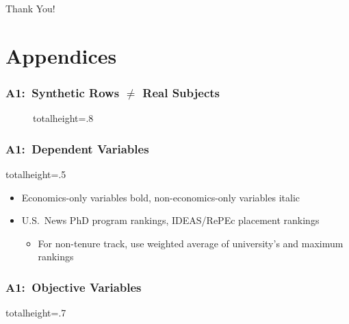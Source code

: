 \documentclass[12pt, aspectratio=169]{beamer}
\newcommand{\backupbegin}{
   \newcounter{finalframe}
   \setcounter{finalframe}{\value{framenumber}}
}
\begin{document}
\begin{frame}[label=ty]
\centering
\Huge Thank You!
\end{frame}

\backupbegin
\section*{Appendices}
\begin{frame}[label=sde]
\frametitle{A1:\ Synthetic Rows $\neq$ Real Subjects}
\begin{figure}
  \centering
  \begin{adjustbox}{totalheight=.8\textheight}

  \end{adjustbox}
\end{figure}%
\hyperlink{sdp}{}
\end{frame}

\begin{frame}[label=dv]
\frametitle{A1:\ Dependent Variables}
\begin{table}[htbp]
  \centering
  \renewcommand{\thetable}{\arabic{table}a}
  \caption{Dependent Variables}
  \vspace{5pt}
  \begin{adjustbox}{totalheight=.5\textheight}

  \end{adjustbox}
\end{table}%
\begin{itemize}
\item Economics-only variables bold, non-economics-only variables italic
\vspace{2.5pt}
\item U.S.\ News PhD program rankings, IDEAS/RePEc placement rankings
\vspace{1.25pt}
\begin{itemize}
\item For non-tenure track, use weighted average of university's and maximum rankings
\vspace{2.5pt}
\end{itemize}
\end{itemize}
\hyperlink{dd}{}
\end{frame}

\begin{frame}[label=ov]
\frametitle{A1:\ Objective Variables}
\addtocounter{framenumber}{-1}
\begin{table}[htbp]
  \centering
  \addtocounter{table}{-1}
  \renewcommand{\thetable}{\arabic{table}b}
  \caption{Objective Independent Variables}
  \vspace{5pt}
  \begin{adjustbox}{totalheight=.7\textheight}

  \end{adjustbox}
\end{table}%
\hyperlink{dd}{}
\end{frame}
\end{document}
